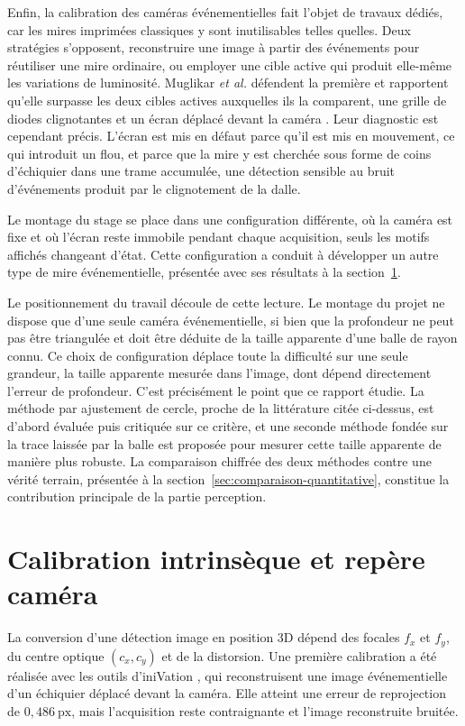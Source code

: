 \documentclass[a4paper,11pt]{report}
\begin{document}
Enfin, la calibration des caméras événementielles fait l'objet de travaux dédiés, car les mires imprimées classiques y sont inutilisables telles quelles. Deux stratégies s'opposent, reconstruire une image à partir des événements pour réutiliser une mire ordinaire, ou employer une cible active qui produit elle-même les variations de luminosité. Muglikar \emph{et al.} défendent la première et rapportent qu'elle surpasse les deux cibles actives auxquelles ils la comparent, une grille de diodes clignotantes et un écran déplacé devant la caméra \cite{muglikar-calibration}. Leur diagnostic est cependant précis. L'écran est mis en défaut parce qu'il est mis en mouvement, ce qui introduit un flou, et parce que la mire y est cherchée sous forme de coins d'échiquier dans une trame accumulée, une détection sensible au bruit d'événements produit par le clignotement de la dalle.

Le montage du stage se place dans une configuration différente, où la caméra est fixe et où l'écran reste immobile pendant chaque acquisition, seuls les motifs affichés changeant d'état. Cette configuration a conduit à développer un autre type de mire événementielle, présentée avec ses résultats à la section~\ref{sec:calibration-intrinseque}.

Le positionnement du travail découle de cette lecture. Le montage du projet ne dispose que d'une seule caméra événementielle, si bien que la profondeur ne peut pas être triangulée et doit être déduite de la taille apparente d'une balle de rayon connu. Ce choix de configuration déplace toute la difficulté sur une seule grandeur, la taille apparente mesurée dans l'image, dont dépend directement l'erreur de profondeur. C'est précisément le point que ce rapport étudie. La méthode par ajustement de cercle, proche de la littérature citée ci-dessus, est d'abord évaluée puis critiquée sur ce critère, et une seconde méthode fondée sur la trace laissée par la balle est proposée pour mesurer cette taille apparente de manière plus robuste. La comparaison chiffrée des deux méthodes contre une vérité terrain, présentée à la section~\ref{sec:comparaison-quantitative}, constitue la contribution principale de la partie perception.

\section{Calibration intrinsèque et repère caméra}
\label{sec:calibration-intrinseque}

La conversion d'une détection image en position 3D dépend des focales \(f_x\)
et \(f_y\), du centre optique \((c_x,c_y)\) et de la distorsion. Une première
calibration a été réalisée avec les outils d'iniVation \cite{inivation-docs},
qui reconstruisent une image événementielle d'un échiquier déplacé devant la
caméra. Elle atteint une erreur de reprojection de \(0{,}486~\text{px}\), mais
l'acquisition reste contraignante et l'image reconstruite bruitée.
\end{document}
